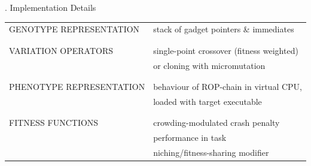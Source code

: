 \documentclass[9pt]{beamer}
\begin{document}

\begin{frame}{\theframenumber. Implementation Details}

  \begin{tabular}{l | l}
    GENOTYPE REPRESENTATION & stack of gadget pointers \& immediates\\
    \\ \\
    VARIATION OPERATORS & single-point crossover (fitness weighted) \\
                        & or cloning with micromutation \\
    \\ \\
    PHENOTYPE REPRESENTATION & behaviour of ROP-chain in virtual CPU,\\
                             & loaded with target executable \\
    \\ \\
    FITNESS FUNCTIONS & crowding-modulated crash penalty \\
                      & performance in task \\
                      & niching/fitness-sharing modifier \\
  \end{tabular}
  
\end{frame}
\end{document}
